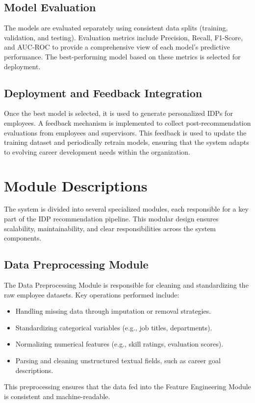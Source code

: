 \subsection{Model Evaluation}
The models are evaluated separately using consistent data splits (training, validation, and testing). Evaluation metrics include Precision, Recall, F1-Score, and AUC-ROC to provide a comprehensive view of each model's predictive performance. The best-performing model based on these metrics is selected for deployment.

\subsection{Deployment and Feedback Integration}
Once the best model is selected, it is used to generate personalized IDPs for employees. A feedback mechanism is implemented to collect post-recommendation evaluations from employees and supervisors. This feedback is used to update the training dataset and periodically retrain models, ensuring that the system adapts to evolving career development needs within the organization.

\section{Module Descriptions}
\label{section:module_descriptions}

The system is divided into several specialized modules, each responsible for a key part of the IDP recommendation pipeline. This modular design ensures scalability, maintainability, and clear responsibilities across the system components.

\subsection{Data Preprocessing Module}
The Data Preprocessing Module is responsible for cleaning and standardizing the raw employee datasets. Key operations performed include:
\begin{itemize}
    \item Handling missing data through imputation or removal strategies.
    \item Standardizing categorical variables (e.g., job titles, departments).
    \item Normalizing numerical features (e.g., skill ratings, evaluation scores).
    \item Parsing and cleaning unstructured textual fields, such as career goal descriptions.
\end{itemize}
This preprocessing ensures that the data fed into the Feature Engineering Module is consistent and machine-readable.

